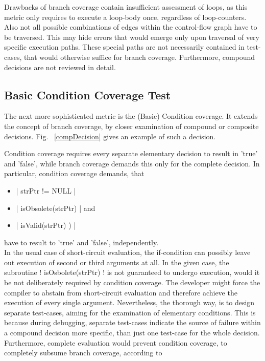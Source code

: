	Drawbacks of branch coverage contain insufficient assessment of loops, as this metric only requires to execute a loop-body once, regardless of loop-counters. Also not all possible combinations of edges within the control-flow graph have to be traversed. This may hide errors that would emerge only upon traversal of very specific execution paths. These special paths are not necessarily contained in test-cases, that would otherwise suffice for branch coverage. Furthermore, compound decisions are not reviewed in detail.
	\subsection{Basic Condition Coverage Test}
	The next more sophisticated metric is the (Basic) Condition coverage. It extends the concept of branch coverage, by closer examination of compound or composite decisions. Fig. ~\ref{compDecision} gives an example of such a decision. 
	
	
	Condition coverage requires every separate elementary decision to result in 'true' and 'false', while branch coverage demands this only for the complete decision. In particular, condition coverage demands, that 
	\begin{itemize} \setlength\itemsep{1px}
		\item \lstC |	strPtr != NULL 		|
		\item \lstC | 	isObsolete(strPtr)	| and
		\item \lstC | 	isValid(strPtr) )	|
	\end{itemize}
	have to result to 'true' and 'false', independently. \\

	In the usual case of short-circuit evaluation, the if-condition can possibly leave out execution of second or third arguments at all. In the given case, the subroutine \lstC ! isOsbolete(strPtr) ! is not guaranteed to undergo execution, would it be not deliberately required by condition coverage. The developer might force the compiler to abstain from short-circuit evaluation and therefore achieve the execution of every single argument. Nevertheless, the thorough way, is to design separate test-cases, aiming for the examination of elementary conditions. This is because during debugging, separate test-cases indicate the source of failure within a compound decision more specific, than just one test-case for the whole decision. Furthermore, complete evaluation would prevent condition coverage, to completely subsume branch coverage, according to 
	
